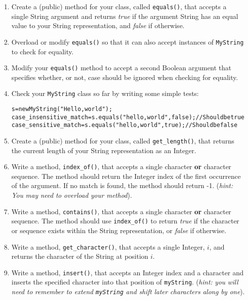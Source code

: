 \documentclass[11pt,a4paper]{report}
\begin{document}
\begin{enumerate}
    \item Create a (public) method for your class, called \texttt{equals()}, that accepts a single String argument and returns \textit{true} if the argument String has an equal value to your String representation, and \textit{false} if otherwise.

    \item Overload or modify \texttt{equals()} so that it can also accept instances of \texttt{MyString} to check for equality.

    \item Modify your \texttt{equals()} method to accept a second Boolean argument that specifies whether, or not, case should be ignored when checking for equality.

    \item Check your \texttt{MyString} class so far by writing some simple tests:
\begin{alltt}
s = new MyString("Hello, world");
case_insensitive_match = s.equals("hello, world", false); // Should be true
case_sensitive_match = s.equals("hello, world", true); // Should be false
\end{alltt}

    \item Create a (public) method for your class, called \texttt{get\_length()}, that returns the current length of your String representation as an Integer.

    \item Write a method, \texttt{index\_of()}, that accepts a single character \textbf{or} character sequence. The method should return the Integer index of the first occurrence of the argument. If no match is found, the method should return -1. (\textit{hint: You may need to overload your method}).

    \item Write a method, \texttt{contains()}, that accepts a single character \textbf{or} character sequence. The method should use \texttt{index\_of()} to return \textit{true} if the character or sequence exists within the String representation, or \textit{false} if otherwise.

    \item Write a method, \texttt{get\_character()}, that accepts a single Integer, $i$, and returns the character of the String at position $i$. 
 
    \item Write a method, \texttt{insert()}, that accepts an Integer index and a character and inserts the specified character into that position of \texttt{myString}. (\textit{hint: you will need to remember to extend \texttt{myString} and shift later characters along by one}).


\end{enumerate}
\end{document}
